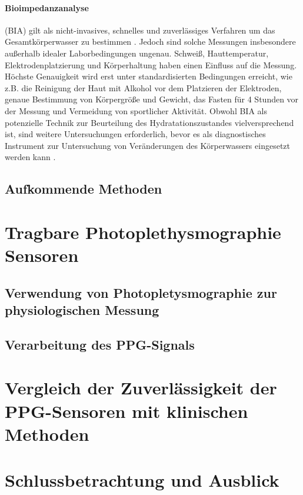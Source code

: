 \documentclass[10pt,a4paper,headinclude,twoside, plainheadsepline, open=right, numbers=noenddot, twocolumn]{article}
\begin{document}
\paragraph{Bioimpedanzanalyse} (BIA) gilt als nicht-invasives, schnelles und zuverlässiges Verfahren um das Gesamtkörperwasser zu bestimmen \cite{kavouras2002assessing}.
Jedoch sind solche Messungen insbesondere außerhalb idealer Laborbedingungen ungenau.
Schweiß, Hauttemperatur, Elektrodenplatzierung und Körperhaltung haben einen Einfluss auf die Messung.
Höchste Genauigkeit wird erst unter standardisierten Bedingungen erreicht, wie z.B. die Reinigung der Haut mit Alkohol vor dem Platzieren der Elektroden, genaue Bestimmung von Körpergröße und Gewicht, das Fasten für 4 Stunden vor der Messung und Vermeidung von sportlicher Aktivität. 
Obwohl BIA als potenzielle Technik zur Beurteilung des Hydratationszustandes vielversprechend ist, sind weitere Untersuchungen erforderlich, bevor es als diagnostisches Instrument zur Untersuchung von Veränderungen des Körperwassers eingesetzt werden kann \cite{garret2018engineering} \cite{kavouras2002assessing}.





\subsection{Aufkommende Methoden}
\label{aufkommende methoden}


\section{Tragbare Photoplethysmographie Sensoren}
\label{tragbare photoplethysmographie sensoren}


\subsection{Verwendung von Photopletysmographie zur physiologischen Messung}
\label{verwendung von photopletysmographie zur physiologischen messung}


\subsection{Verarbeitung des PPG-Signals}
\label{verarbeitung des ppg-signals}

\section{Vergleich der Zuverlässigkeit der PPG-Sensoren mit klinischen Methoden}
\label{vergleich der verfahren}

\section{Schlussbetrachtung und Ausblick}
\label{schlussbetrachtung und ausblick}


%
\printbibliography
\end{document}
